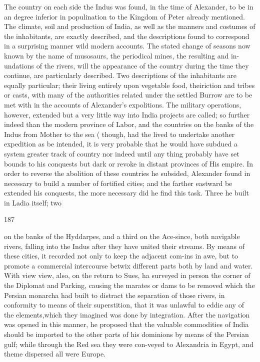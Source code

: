 \documentclass{article}
\begin{document}
The country on each side the Indus was found, in the time of Alexander, to be in an degree inferior in populination to the Kingdom of Peter already mentioned. The climate, soil and production of India, as well as the manners and costumes of the inhabitants, are exactly described, and the descriptions found to correspond in a surprising manner wild modern accounts. The stated change of seasons now known by the name of musosaurs, the periodical mines, the resulting and in-undations of the rivers, will the appearance of the country during the time they continue, are particularly described. Two descriptions of the inhabitants are equally particular; their living entirely upon vegetable food, theiriction and tribes or casts, with many of the authorities related under the settled Burrow are to be met with in the accounts of Alexander’s expolitions. The military operations, however, extended but a very little way into India projects are called; so further indeed than the modern province of Labor, and the countries on the banks of the Indus from Mother to the sea ( though, had the lived to undertake another expedition as be intended, it is very probable that he would have subdued a system greater track of country nor indeed until any thing probably have set bounds to his conquests but dark or revoke in distant provinces of His empire. In order to reverse the abolition of these countries he subsided, Alexander found in necessary to build a number of fortified cities; and the farther eastward be extended his conquests, the more necessary did he find this task. Three he built in Ladia itself; two

187

on the banks of the Hyddarpes, and a third on the Ace-since, both navigable rivers, falling into the Indus after they have united their streams. By means of these cities, it recorded not only to keep the adjacent com-ins in awe, but to promote a commercial intercourse betwix different parts both by land and water. With view view, also, on the return to Sues, ha surveyed in person the corner of the Diplomat and Parking, causing the marates or dams to be removed which the Persian monarcha had built to distract the separation of those rivers, in conformity to means of their superstition, that it was unlawful to eddie any of the elements,which they imagined was done by integration. After the navigation was opened in this manner, he proposed that the valuable commodities of India should be imported to the other parts of his dominions by means of the Persian gulf; while through the Red sea they were con-veyed to Alexandria in Egypt, and theme dispersed all were Europe.
\end{document}
